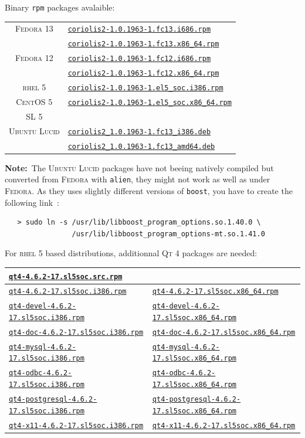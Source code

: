 \documentclass[11pt]{article}
\newcommand {\crlFtpUrl}    [1] {http://asim.lip6.fr/pub/coriolis/2.0/#1}
\newcommand {\slSocSrpmsUrl}[1] {http://ftp.lip6.fr/pub/linux/distributions/slsoc/5x/i386/SLSoC/SRPMS/#1}
\newcommand {\slRpmsiUrl}   [1] {http://ftp.lip6.fr/pub/linux/distributions/slsoc/5x/i386/i386/SL/#1}
\newcommand {\slRpmsxUrl}   [1] {http://ftp.lip6.fr/pub/linux/distributions/slsoc/5x/x86\_64/x86\_64/SL/#1}
\newcommand{\crlFtpRef}    [1]{\href{\crlFtpUrl{#1}}{\texttt{\footnotesize #1}}}
\newcommand{\slSocSrpmsRef}[1]{\href{\slSocSrpmsUrl{#1}}{\texttt{\footnotesize #1}}}
\newcommand{\slRpmsiRef}   [1]{\href{\slRpmsiUrl{#1}}{\texttt{\footnotesize #1}}}
\newcommand{\slRpmsxRef}   [1]{\href{\slRpmsxUrl{#1}}{\texttt{\footnotesize #1}}}
\newcommand{\crlFtpRef}    [1]{\htmladdnormallink{#1}{\crlFtpUrl{#1}}}
\newcommand{\slSocSrpmsRef}[1]{\htmladdnormallink{#1}{\slSocSrpmsUrl{#1}}}
\newcommand{\slRpmsiRef}   [1]{\htmladdnormallink{#1}{\slRpmsiUrl{#1}}}
\newcommand{\slRpmsxRef}   [1]{\htmladdnormallink{#1}{\slRpmsxUrl{#1}}}
\newcommand {\RHELV}              {\textsc{rhel 5}\xspace}
\newcommand {\CentOSV}            {\textsc{CentOS 5}\xspace}
\newcommand {\SLV}                {\textsc{SL 5}\xspace}
\newcommand {\Fedora}             {\textsc{Fedora}\xspace}
\newcommand {\FedoraXII}          {\textsc{Fedora 12}\xspace}
\newcommand {\FedoraXIII}         {\textsc{Fedora 13}\xspace}
\newcommand {\Lucid}              {\textsc{Ubuntu Lucid}\xspace}
\newcommand {\QtIV}               {\textsc{Qt 4}\xspace}
\newcommand {\rpm}                {\texttt{rpm}\xspace}
\newcommand {\alien}              {\texttt{alien}\xspace}
\newcommand {\boost}              {\texttt{boost}\xspace}
\newcommand {\coriolisIIfcXIIIirpm}{\crlFtpRef{coriolis2-1.0.1963-1.fc13.i686.rpm}\xspace}
\newcommand {\coriolisIIfcXIIIxrpm}{\crlFtpRef{coriolis2-1.0.1963-1.fc13.x86\_64.rpm}\xspace}
\newcommand {\coriolisIIfcXIIirpm} {\crlFtpRef{coriolis2-1.0.1963-1.fc12.i686.rpm}\xspace}
\newcommand {\coriolisIIfcXIIxrpm} {\crlFtpRef{coriolis2-1.0.1963-1.fc12.x86\_64.rpm}\xspace}
\newcommand {\coriolisIIslVirpm}   {\crlFtpRef{coriolis2-1.0.1963-1.el5\_soc.i386.rpm}\xspace}
\newcommand {\coriolisIIslVxrpm}   {\crlFtpRef{coriolis2-1.0.1963-1.el5\_soc.x86\_64.rpm}\xspace}
\newcommand {\coriolisIILucidideb} {\crlFtpRef{coriolis2\_1.0.1963-1.fc13\_i386.deb}\xspace}
\newcommand {\coriolisIILucidxdeb} {\crlFtpRef{coriolis2\_1.0.1963-1.fc13\_amd64.deb}\xspace}
\newcommand {\qtIVsrpm}            {\slSocSrpmsRef{qt4-4.6.2-17.sl5soc.src.rpm}\xspace}
\newcommand {\qtIVirpm}            {\slRpmsiRef{qt4-4.6.2-17.sl5soc.i386.rpm}\xspace}
\newcommand {\qtIVdevelirpm}       {\slRpmsiRef{qt4-devel-4.6.2-17.sl5soc.i386.rpm}\xspace}
\newcommand {\qtIVdocirpm}         {\slRpmsiRef{qt4-doc-4.6.2-17.sl5soc.i386.rpm}\xspace}
\newcommand {\qtIVmysqlirpm}       {\slRpmsiRef{qt4-mysql-4.6.2-17.sl5soc.i386.rpm}\xspace}
\newcommand {\qtIVodbcirpm}        {\slRpmsiRef{qt4-odbc-4.6.2-17.sl5soc.i386.rpm}\xspace}
\newcommand {\qtIVpostgresqlirpm}  {\slRpmsiRef{qt4-postgresql-4.6.2-17.sl5soc.i386.rpm}\xspace}
\newcommand {\qtIVxXIirpm}         {\slRpmsiRef{qt4-x11-4.6.2-17.sl5soc.i386.rpm}\xspace}
\newcommand {\qtIVxrpm}            {\slRpmsxRef{qt4-4.6.2-17.sl5soc.x86\_64.rpm}\xspace}
\newcommand {\qtIVdevelxrpm}       {\slRpmsxRef{qt4-devel-4.6.2-17.sl5soc.x86\_64.rpm}\xspace}
\newcommand {\qtIVdocxrpm}         {\slRpmsxRef{qt4-doc-4.6.2-17.sl5soc.x86\_64.rpm}\xspace}
\newcommand {\qtIVmysqlxrpm}       {\slRpmsxRef{qt4-mysql-4.6.2-17.sl5soc.x86\_64.rpm}\xspace}
\newcommand {\qtIVodbcxrpm}        {\slRpmsxRef{qt4-odbc-4.6.2-17.sl5soc.x86\_64.rpm}\xspace}
\newcommand {\qtIVpostgresqlxrpm}  {\slRpmsxRef{qt4-postgresql-4.6.2-17.sl5soc.x86\_64.rpm}\xspace}
\newcommand {\qtIVxXIxrpm}         {\slRpmsxRef{qt4-x11-4.6.2-17.sl5soc.x86\_64.rpm}\xspace}
\begin{document}
 Binary \rpm packages avalaible:
 \begin{center}
 \begin{tabular}{|c|l|}
   \hline
   \FedoraXIII & \coriolisIIfcXIIIirpm \\
               & \coriolisIIfcXIIIxrpm \\
   \hline
   \FedoraXII  & \coriolisIIfcXIIirpm \\
               & \coriolisIIfcXIIxrpm \\
   \hline
   \RHELV      & \coriolisIIslVirpm  \\
   \CentOSV    & \coriolisIIslVxrpm  \\
   \SLV        &                     \\
   \hline
   \Lucid      & \coriolisIILucidideb \\
               & \coriolisIILucidxdeb \\
   \hline
 \end{tabular}
 \end{center}

 \noindent\textbf{Note:}\ The \Lucid packages have not beeing natively
 compiled but converted from \Fedora with \alien, they might not work as
 well as under \Fedora. As they uses slightly different versions of \boost,
 you have to create the following link~:
 \begin{verbatim}
   > sudo ln -s /usr/lib/libboost_program_options.so.1.40.0 \
                /usr/lib/libboost_program_options-mt.so.1.41.0
 \end{verbatim}

 \newpage

 For \RHELV based distributions, additionnal \QtIV packages are needed:

 \begin{center}
 \begin{tabular}{|l|l|}
   \hline
   \multicolumn{2}{|l|}{\qtIVsrpm} \\
   \hline
   \hline
   \qtIVirpm           & \qtIVxrpm           \\
   \qtIVdevelirpm      & \qtIVdevelxrpm      \\
   \qtIVdocirpm        & \qtIVdocxrpm        \\
   \qtIVmysqlirpm      & \qtIVmysqlxrpm      \\
   \qtIVodbcirpm       & \qtIVodbcxrpm       \\
   \qtIVpostgresqlirpm & \qtIVpostgresqlxrpm \\
   \qtIVxXIirpm        & \qtIVxXIxrpm        \\
   \hline
 \end{tabular}
 \end{center}
\end{document}
